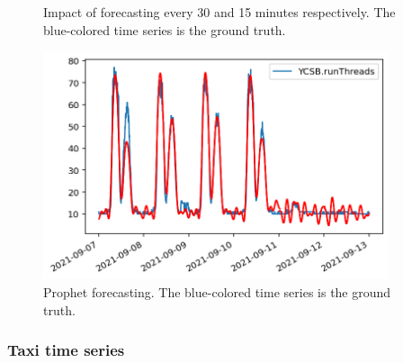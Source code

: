 \documentclass[a4paper, 12pt]{article} %
\begin{document}
	\begin{figure}\centering
		\caption{Impact of forecasting every 30 and 15 minutes respectively. The blue-colored time series is the ground truth.}
		\label{fig:results_forecasting_bank_deepar}
	\end{figure}
	
	\begin{figure} \centering
		\includegraphics[width=4in]{img/results_forecasting_bank_prophet.png}
		\caption{Prophet forecasting. The blue-colored time series is the ground truth.}
		\label{fig:results_forecasting_bank_prophet}
	\end{figure}
	
	\clearpage
	\subsubsection{Taxi time series} \label{sssec:results_forecasting_taxi}
	
\end{document}

